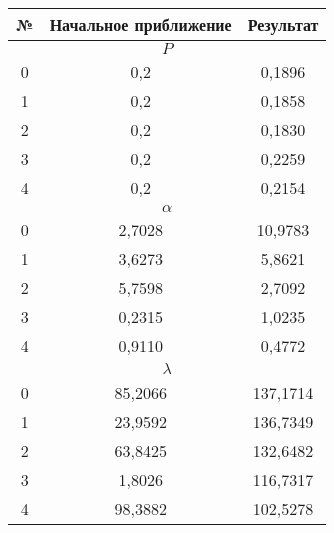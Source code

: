 \begin{multicols}{2}
\begin{table*}
\begin{minipage}[t]{76mm}
\begin{center}
\tabcolsep=8.7pt
\begin{tabular}{|c|c|c|}
\hline
№&Начальное приближение&Результат\\
\hline
\multicolumn{3}{|c|}{$P$}\\
\hline
0&0,2&0,1896\\
1&0,2&0,1858\\
2&0,2&0,1830\\
3&0,2&0,2259\\
4&0,2&0,2154\\
\hline
\multicolumn{3}{|c|}{$\alpha$}\\
\hline
0&2,7028&10,9783\hphantom{9}\\
1&3,6273&5,8621 \\
2&5,7598&2,7092\\
3&0,2315&1,0235\\
4&0,9110&0,4772\\
\hline
\multicolumn{3}{|c|}{$\lambda$}\\
\hline
0&85,2066&137,1714  \\
1&23,9592&136,7349\\
2&63,8425&132,6482\\
3&\hphantom{9}1,8026&116,7317\\
4&98,3882&102,5278\\
\hline
\end{tabular}
\end{center}
\end{minipage}\hfill
\begin{minipage}[t]{76mm}
\begin{center}
 \vspace*{2ex}


\end{center}
\end{minipage}
\end{table*}
\end{multicols}
